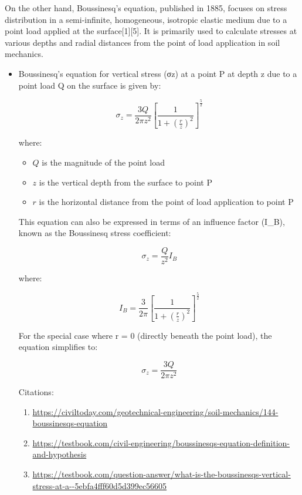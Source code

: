 \documentclass[xcolor=dvipsnames,10pt,hidelinks]{article}
\begin{document}
\begin{itemize}
\begin{itemize}
On the other hand, Boussinesq's equation, published in 1885, focuses on stress distribution in a semi-infinite, homogeneous, isotropic elastic medium due to a point load applied at the surface[1][5]. It is primarily used to calculate stresses at various depths and radial distances from the point of load application in soil mechanics.

\begin{itemize}
\item Boussinesq's equation for vertical stress (σz) at a point P at depth z due to a point load Q on the surface is given by:

$$ \sigma_z = \frac{3Q}{2\pi z^2} \left[ \frac{1}{1+\left(\frac{r}{z}\right)^2} \right]^{\frac{5}{2}} $$

where:
\begin{itemize}
\item \(Q\) is the magnitude of the point load
\item \(z\) is the vertical depth from the surface to point P
\item \(r\) is the horizontal distance from the point of load application to point P
\end{itemize}

This equation can also be expressed in terms of an influence factor (I\_B), known as the Boussinesq stress coefficient:

$$ \sigma_z = \frac{Q}{z^2} I_B $$

where:

$$ I_B = \frac{3}{2\pi} \left[ \frac{1}{1+\left(\frac{r}{z}\right)^2} \right]^{\frac{5}{2}} $$

For the special case where r = 0 (directly beneath the point load), the equation simplifies to:

$$ \sigma_z = \frac{3Q}{2\pi z^2} $$

Citations:
\begin{enumerate}
\item \url{https://civiltoday.com/geotechnical-engineering/soil-mechanics/144-boussinesqs-equation}
\item \url{https://testbook.com/civil-engineering/boussinesqs-equation-definition-and-hypothesis}
\item \url{https://testbook.com/question-answer/what-is-the-boussinesqs-vertical-stress-at-a--5ebfa4fff60d5d399ec56605}
\end{enumerate}
\end{itemize}
\end{itemize}



\end{itemize}
\end{document}
